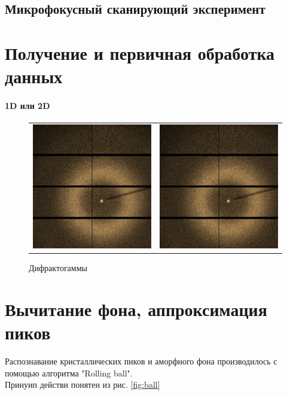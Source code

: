 \subsection{Микрофокусный сканирующий эксперимент}

	
	\section{Получение и первичная обработка данных}
	\paragraph{1D или 2D}
	
	\begin{figure}[ht]\center
\begin{tabular}{cc}
\includegraphics[width=0.5\linewidth]{fig/obj.png}
&
\includegraphics[width=0.5\linewidth]{fig/obj.png} 
\end{tabular}
\caption{Дифрактогаммы}
\end{figure}
	
	
	
	
	\section{Вычитание фона, аппроксимация пиков}
	Распознавание кристаллических пиков и аморфного фона производилось с помощью алгоритма "Rolling ball". \\
	Принуип действи понятен из рис. \ref{fig:ball}
	
